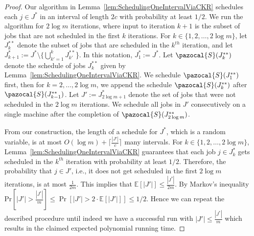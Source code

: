 \begin{proof}
 Our algorithm in Lemma~\ref{lem:SchedulingOneIntervalViaCKR} schedules each $j \in J^*$ in an interval of length $2c$ with probability at least $1/2$.
 We run the algorithm for $2 \log m$ iterations, where input to iteration $k+1$ is the subset of jobs that are not scheduled in the first $k$ iterations. 
 For $k \in \{1,2,\ldots, 2 \log m \}$, let $J^{**}_k$ denote the subset of jobs that are scheduled in the $k^{th}$ iteration, and let $J^*_{k+1} := J^* \setminus \{ \bigcup^{k}_{k' = 1} J^{**}_{k'}$\}.
 In this notation,  $J^*_1 := J^*$.
 Let  $\pazocal{S}(J^{**}_k)$ denote the schedule of jobs $J^{**}_k$  given by Lemma~\ref{lem:SchedulingOneIntervalViaCKR}.
 We schedule $\pazocal{S}(J^{**}_1)$ first, then for $k = 2,\ldots, 2 \log m$, we append the schedule $\pazocal{S}(J^{**}_k)$ after $\pazocal{S}(J^{**}_{k-1})$. %
Let $J' := J^{*}_{2\log m +1}$ denote the set of jobs that were not scheduled in the $2\log m$ iterations.
We schedule all jobs in $J'$ consecutively on a single machine after the completion of $\pazocal{S}(J^{**}_{2 \log m})$.

From our construction, the length of a schedule for  $J^*$, which is a random variable, is at most $O(\log m) +  \lceil \frac{|J'|}{c} \rceil$ many intervals.
For $k \in \{ 1,2, \ldots ,2\log m\}$,  Lemma~\ref{lem:SchedulingOneIntervalViaCKR}  guarantees that each job $j \in J^*_k$ gets scheduled in the $k^{th}$ iteration with probability at least $1/2$.
Therefore, the probability that $j \in J'$,  i.e., it does not get scheduled in the first $2 \log m$ iterations,  is at most $\frac{1}{2m}$.
This implies that $\mathbb{E}[|J'|] \leq \frac{|J^*|} {2m}$.
By Markov's inequality  $\text{Pr}[|J'| > \frac{|J^*|} {m} ] \leq \Pr[|J'| > 2 \cdot \mathbb{E}[|J'|] ] \leq 1/2$.
Hence we can repeat the described procedure until indeed we have a successful run with $|J'| \leq \frac{|J^*|}{m}$ which results in the claimed expected polynomial running time. 


\end{proof}
